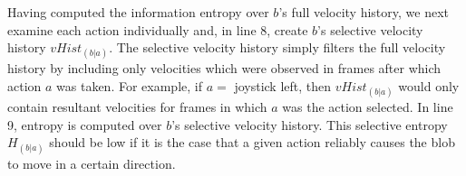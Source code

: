 \documentclass{acm_proc_article-sp}
\begin{document}
Having computed the information entropy over $b$'s full velocity history, we next examine each action individually and, in line 8, create $b$'s selective velocity history $vHist_{(b|a)}$. The selective velocity history simply filters the full velocity history by including only velocities which were observed in frames after which action $a$ was taken. For example, if $a = $ joystick left, then $vHist_{(b|a)}$ would only contain resultant velocities for frames in which $a$ was the action selected. In line 9, entropy is computed over $b$'s selective velocity history. This selective entropy $H_{(b|a)}$ should be low if it is the case that a given action reliably causes the blob to move in a certain direction.

\begin{figure}
  \centering
  \hspace{.1in}
  \hspace{.1in}
  \hspace{.1in}

\end{figure}
\end{document}
